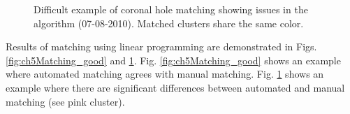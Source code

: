 \documentclass[journal]{IEEEtran}
\begin{document}
\begin{figure}
        
        \caption{Difficult example of coronal hole matching showing issues in the algorithm 
                (07-08-2010). Matched clusters share the same color. }        
        \label{fig:ch5Matching_bad}
\end{figure}

Results of matching using linear programming are demonstrated in Figs. \ref{fig:ch5Matching_good} 
and \ref{fig:ch5Matching_bad}.
Fig. \ref{fig:ch5Matching_good} shows an example where automated matching
agrees with manual matching.
Fig. \ref{fig:ch5Matching_bad} shows an example where there are significant
differences between automated and manual matching (see pink cluster).

\end{document}
